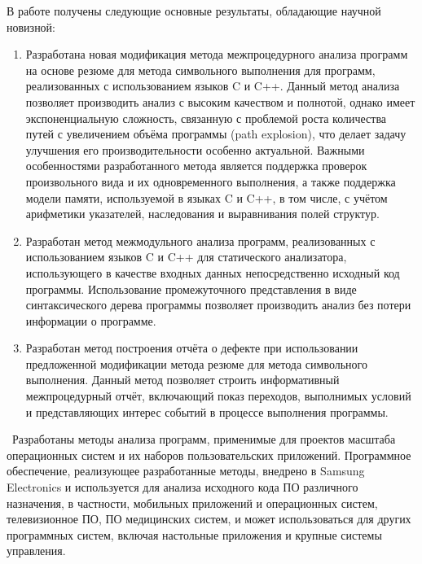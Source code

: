 \novelty

В работе получены следующие основные результаты, обладающие научной новизной:
\begin{enumerate}
  \item Разработана новая модификация метода межпроцедурного анализа программ на основе резюме для метода символьного выполнения для программ, реализованных с использованием языков C и C++. Данный метод анализа позволяет производить анализ с высоким качеством и полнотой, однако имеет экспоненциальную сложность, связанную с проблемой роста количества путей с увеличением объёма программы (path explosion), что делает задачу улучшения его производительности особенно актуальной. Важными особенностями разработанного метода является поддержка проверок произвольного вида и их одновременного выполнения, а также поддержка модели памяти, используемой в языках C и C++, в том числе, с учётом арифметики указателей, наследования и выравнивания полей структур.
  \item Разработан метод межмодульного анализа программ, реализованных с использованием языков C и C++ для статического анализатора, использующего в качестве входных данных непосредственно исходный код программы. Использование промежуточного представления в виде синтаксического дерева программы позволяет производить анализ без потери информации о программе.
  \item Разработан метод построения отчёта о дефекте при использовании предложенной модификации метода резюме для метода символьного выполнения. Данный метод позволяет строить информативный межпроцедурный отчёт, включающий показ переходов, выполнимых условий и представляющих интерес событий в процессе выполнения программы.
\end{enumerate}

\influence\ Разработаны методы анализа программ, применимые для проектов масштаба операционных систем и их наборов пользовательских приложений. Программное обеспечение, реализующее разработанные методы, внедрено в Samsung Electronics и используется для анализа исходного кода ПО различного назначения, в частности, мобильных приложений и операционных систем, телевизионное ПО, ПО медицинских систем, и может использоваться для других программных систем, включая настольные приложения и крупные системы управления. 

